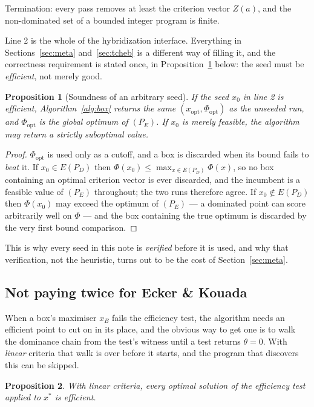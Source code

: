 \documentclass[11pt,a4paper]{article}
\newtheorem{proposition}{Proposition}
\newcommand{\Z}{Z}
\newcommand{\Dset}{D}
\newcommand{\E}{E(P_{\Dset})}
\begin{document}
Termination: every pass removes at least the criterion vector $\Z(a)$, and the
non-dominated set of a bounded integer program is finite.

Line 2 is the whole of the hybridization interface. Everything in
Sections~\ref{sec:meta} and~\ref{sec:tcheb} is a different way of filling it,
and the correctness requirement is stated once, in Proposition~\ref{prop:seed}
below: the seed must be \emph{efficient}, not merely good.

\begin{proposition}[Soundness of an arbitrary seed]\label{prop:seed}
If the seed $x_0$ in line 2 is efficient, Algorithm~\ref{alg:box} returns the
same $(x_{\mathrm{opt}}, \Phi_{\mathrm{opt}})$ as the unseeded run, and
$\Phi_{\mathrm{opt}}$ is the global optimum of $(P_E)$. If $x_0$ is merely
feasible, the algorithm may return a strictly suboptimal value.
\end{proposition}

\begin{proof}
$\Phi_{\mathrm{opt}}$ is used only as a cutoff, and a box is discarded when its
bound fails to \emph{beat} it. If $x_0 \in \E$ then
$\Phi(x_0) \leqslant \max_{x \in \E}\Phi(x)$, so no box containing an optimal
criterion vector is ever discarded, and the incumbent is a feasible value of
$(P_E)$ throughout; the two runs therefore agree. If $x_0 \notin \E$ then
$\Phi(x_0)$ may exceed the optimum of $(P_E)$ --- a dominated point can score
arbitrarily well on $\Phi$ --- and the box containing the true optimum is
discarded by the very first bound comparison.
\end{proof}

\noindent
This is why every seed in this note is \emph{verified} before it is used, and
why that verification, not the heuristic, turns out to be the cost of
Section~\ref{sec:meta}.

\subsection{Not paying twice for Ecker \& Kouada}
\label{sec:ecker}

When a box's maximiser $x_B$ fails the efficiency test, the algorithm needs an
efficient point to cut on in its place, and the obvious way to get one is to
walk the dominance chain from the test's witness until a test returns
$\theta = 0$. With \emph{linear} criteria that walk is over before it starts,
and the program that discovers this can be skipped.

\begin{proposition}\label{prop:ecker}
With linear criteria, every optimal solution of the efficiency test applied to
$x^{*}$ is efficient.
\end{proposition}
\end{document}
